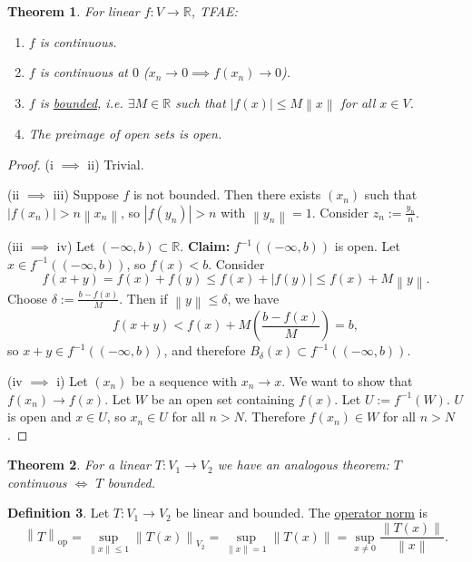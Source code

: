\documentclass[12pt]{article}
\newcommand{\abs}[1]{\left| #1 \right|}
\newcommand{\norm}[1]{\left\| #1 \right\|}
\newcommand{\R}{\mathbb{R}}
\newtheorem{thm}{Theorem}[section]
\theoremstyle{definition}
\newtheorem{defn}[thm]{Definition}
\begin{document}
\begin{thm}
	For linear $f : V \to \R$, TFAE:
	\begin{enumerate}[label=(\roman*),nosep]
		\item $f$ is continuous.
		\item $f$ is continuous at $0$ ($x_n \to 0 \implies f(x_n) \to 0$).
		\item $f$ is \underline{bounded}, i.e. $\exists M \in \R$ such that $\abs{f(x)} \leq M \norm{x}$ for all $x \in V$.
		\item The preimage of open sets is open.
	\end{enumerate}
\end{thm}
\begin{proof}
	(i $\implies$ ii) Trivial.

	(ii $\implies$ iii) Suppose $f$ is not bounded.
	Then there exists $(x_n)$ such that $\abs{f(x_n)} > n \norm{x_n}$, so $\abs{f(y_n)} > n$ with $\norm{y_n} = 1$.
	Consider $z_n := \frac{y_n}{n}$.

	(iii $\implies$ iv) Let $(-\infty, b) \subset \R$.
	\textbf{Claim: } $f^{-1}((-\infty,b))$ is open.
	Let $x \in f^{-1}((-\infty,b))$, so $f(x) < b$.
	Consider
	\begin{equation*}
		f(x+y) = f(x) + f(y) \leq f(x) + \abs{f(y)} \leq f(x) + M \norm{y}.
	\end{equation*}
	Choose $\delta := \frac{b - f(x)}{M}$.
	Then if $\norm{y} \leq \delta$, we have
	\begin{equation*}
		f(x+y) < f(x) + M \left( \frac{b - f(x)}{M} \right) = b,
	\end{equation*}
	so $x + y \in f^{-1}((-\infty,b))$, and therefore $B_\delta(x) \subset f^{-1}((-\infty,b))$.

	(iv $\implies$ i) Let $(x_n)$ be a sequence with $x_n \to x$.
	We want to show that $f(x_n) \to f(x)$.
	Let $W$ be an open set containing $f(x)$.
	Let $U := f^{-1}(W)$.
	$U$ is open and $x \in U$, so $x_n \in U$ for all $n > N$.
	Therefore $f(x_n) \in W$ for all $n > N$.
\end{proof}

\begin{thm}
	For a linear $T : V_1 \to V_2$ we have an analogous theorem: $T$ continuous $\iff$ $T$ bounded.
\end{thm}

\begin{defn}
	Let $T : V_1 \to V_2$ be linear and bounded.
	The \underline{operator norm} is
	\begin{equation*}
		\norm{T}_{\mathrm{op}} = \sup_{\norm{x} \leq 1} \norm{T(x)}_{V_2} = \sup_{\norm{x} = 1} \norm{T(x)} = \sup_{x \neq 0} \frac{\norm{T(x)}}{\norm{x}}.
	\end{equation*}
\end{defn}
\end{document}
